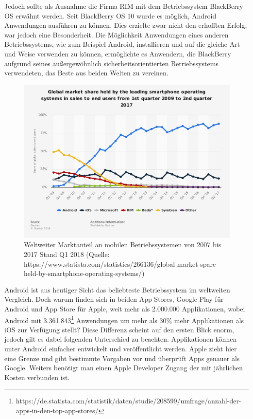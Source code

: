 	Jedoch sollte als Ausnahme die Firma RIM mit dem Betriebssystem BlackBerry OS erwähnt werden. Seit BlackBerry OS 10 wurde es möglich, Android Anwendungen ausführen zu können. Dies erzielte zwar nicht den erhofften Erfolg, war jedoch eine Besonderheit. Die Möglichkeit Anwendungen eines anderen Betriebssystems, wie zum Beispiel Android, installieren und auf die gleiche Art und Weise verwenden zu können, ermöglichte es Anwendern, die BlackBerry aufgrund seines außergewöhnlich sicherheitsorientierten Betriebssystems verwendeten, das Beste aus beiden Welten zu vereinen.

	\newpage
	
	\begin{figure}[h!]
		\centering
		\includegraphics[width=1\textwidth]{images/statistic_id266136_global-mobile-os-market-share-2009-2017-by-quarter.png}
		\caption{Weltweiter Marktanteil an mobilen Betriebssystemen von 2007 bis 2017 Stand Q1 2018 (Quelle: https://www.statista.com/statistics/266136/global-market-spare-held-by-smartphone-operating-systems/)}
		\label{fig:mobile-os-marketshares}
	\end{figure}
	Android ist aus heutiger Sicht das beliebteste Betriebssystem im weltweiten Vergleich. Doch warum finden sich in beiden App Stores, Google Play für Android und App Store für Apple, weit mehr als 2.000.000 Applikationen, wobei Android mit 3.361.843\footnote{https://de.statista.com/statistik/daten/studie/208599/umfrage/anzahl-der-apps-in-den-top-app-stores/} Anwendungen um mehr als 30\% mehr Applikationen als iOS zur Verfügung stellt? Diese Differenz scheint auf den ersten Blick enorm, jedoch gilt es dabei folgenden Unterschied zu beachten. Applikationen können unter Android einfacher entwickelt und veröffentlicht werden. Apple zieht hier eine Grenze und gibt bestimmte Vorgaben vor und überprüft Apps genauer als Google. Weiters benötigt man einen Apple Developer Zugang der mit jährlichen Kosten verbunden ist.

